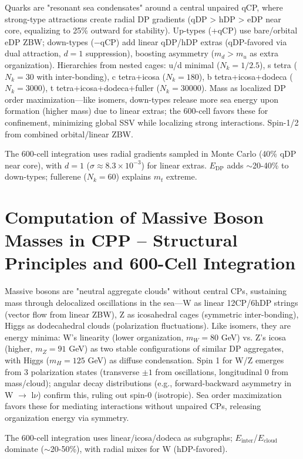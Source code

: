 \documentclass{article}
\begin{document}
Quarks are "resonant sea condensates" around a central unpaired qCP, where strong-type attractions create radial DP gradients (qDP > hDP > eDP near core, equalizing to 25\% outward for stability). Up-types (+qCP) use bare/orbital eDP ZBW; down-types (−qCP) add linear qDP/hDP extras (qDP-favored via dual attraction, $d=1$ suppression), boosting asymmetry ($m_d > m_u$ as extra organization). Hierarchies from nested cages: u/d minimal ($N_k=1/2.5$), s tetra ($N_k=30$ with inter-bonding), c tetra+icosa ($N_k=180$), b tetra+icosa+dodeca ($N_k=3000$), t tetra+icosa+dodeca+fuller ($N_k=30000$). Mass as localized DP order maximization—like isomers, down-types release more sea energy upon formation (higher mass) due to linear extras; the 600-cell favors these for confinement, minimizing global SSV while localizing strong interactions. Spin-1/2 from combined orbital/linear ZBW.

The 600-cell integration uses radial gradients sampled in Monte Carlo (40\% qDP near core), with $d=1$ ($\sigma\approx8.3\times10^{-3}$) for linear extras. $E_{\text{DP}}$ adds $\sim$20-40\% to down-types; fullerene ($N_k=60$) explains $m_t$ extreme.

\section{Computation of Massive Boson Masses in CPP -- Structural Principles and 600-Cell Integration}

Massive bosons are "neutral aggregate clouds" without central CPs, sustaining mass through delocalized oscillations in the sea—W as linear 12CP/6hDP strings (vector flow from linear ZBW), Z as icosahedral cages (symmetric inter-bonding), Higgs as dodecahedral clouds (polarization fluctuations). Like isomers, they are energy minima: W's linearity (lower organization, $m_W=80$ GeV) vs. Z's icosa (higher, $m_Z=91$ GeV) as two stable configurations of similar DP aggregates, with Higgs ($m_H=125$ GeV) as diffuse condensation. Spin 1 for W/Z emerges from 3 polarization states (transverse $\pm1$ from oscillations, longitudinal 0 from mass/cloud); angular decay distributions (e.g., forward-backward asymmetry in W $\to$ l$\nu$) confirm this, ruling out spin-0 (isotropic). Sea order maximization favors these for mediating interactions without unpaired CPs, releasing organization energy via symmetry.

The 600-cell integration uses linear/icosa/dodeca as subgraphs; $E_{\text{inter}}$/$E_{\text{cloud}}$ dominate ($\sim$20-50\%), with radial mixes for W (hDP-favored).
\end{document}
